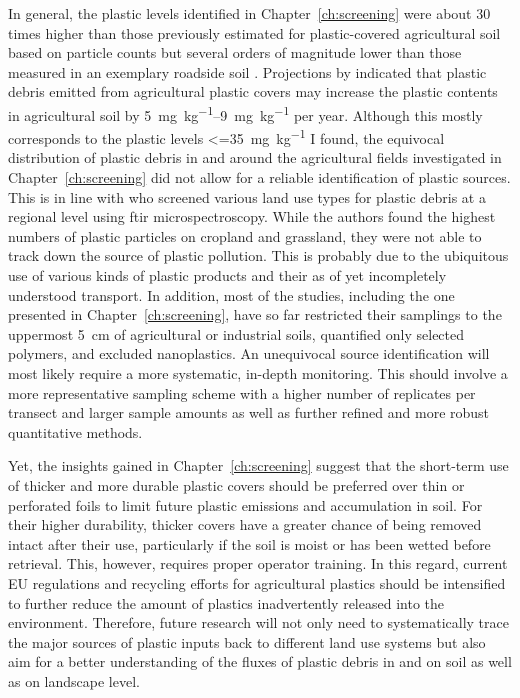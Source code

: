 In general, the plastic levels identified in Chapter~\ref{ch:screening} were about \num{30} times higher than those previously estimated for plastic-covered agricultural soil based on particle counts \citep{BuksGlobal2020} but several orders of magnitude lower than those measured in an exemplary roadside soil \citep{DierkesQuantification2019}. Projections by \citet{BrandesIdentifying2021} indicated that plastic debris emitted from agricultural plastic covers may increase the plastic contents in agricultural soil by \SIrange{5}{9}{\milli\gram\per\kilo\gram} per year.
Although this mostly corresponds to the plastic levels \SI{<=35}{\milli\gram\per\kilo\gram} I found, the equivocal distribution of plastic debris in and around the agricultural fields investigated in Chapter~\ref{ch:screening} did not allow for a reliable identification of plastic sources. This is in line with \citet{CorradiniMicroplastics2021} who screened various land use types for plastic debris at a regional level using \ac{ftir} microspectroscopy. While the authors found the highest numbers of plastic particles on cropland and grassland, they were not able to track down the source of plastic pollution. This is probably due to the ubiquitous use of various kinds of plastic products and their as of yet incompletely understood transport. In addition, most of the studies, including the one presented in Chapter~\ref{ch:screening}, have so far restricted their samplings to the uppermost \SI{5}{\centi\meter} of agricultural or industrial soils, quantified only selected polymers, and excluded nanoplastics. An unequivocal source identification will most likely require a more systematic, in-depth monitoring. This should involve a more representative sampling scheme with a higher number of replicates per transect and larger sample amounts as well as further refined and more robust quantitative methods.

Yet, the insights gained in Chapter~\ref{ch:screening} suggest that the short-term use of thicker and more durable plastic covers should be preferred over thin or perforated foils to limit future plastic emissions and accumulation in soil. For their higher durability, thicker covers have a greater chance of being removed intact after their use, particularly if the soil is moist or has been wetted before retrieval. This, however, requires proper operator training. In this regard, current EU regulations \citep{EN13655Plastics2018} and recycling efforts for agricultural plastics should be intensified to further reduce the amount of plastics inadvertently released into the environment.
Therefore, future research will not only need to systematically trace the major sources of plastic inputs back to different land use systems but also aim for a better understanding of the fluxes of plastic debris in and on soil as well as on landscape level.

